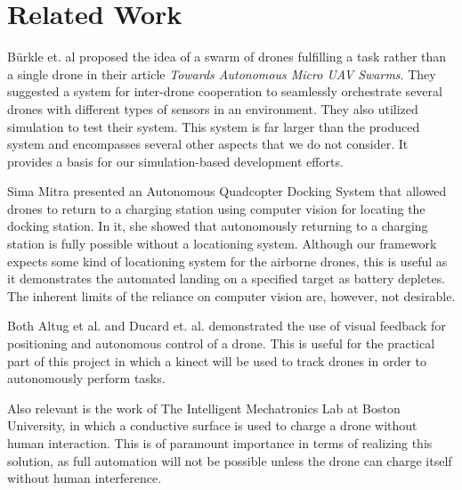\section{Related Work}
Bürkle et. al proposed the idea of a swarm of drones fulfilling a task rather than a single drone in their article \textit{Towards Autonomous Micro UAV Swarms}\cite{burkleetal}. They suggested a system for inter-drone cooperation to seamlessly orchestrate several drones with different types of sensors in an environment. They also utilized simulation to test their system. This system is far larger than the produced system and encompasses several other aspects that we do not consider. It provides a basis for our simulation-based development efforts.

Sima Mitra presented an Autonomous Quadcopter Docking System\cite{simamitra} that allowed drones to return to a charging station using computer vision for locating the docking station. In it, she showed that autonomously returning to a charging station is fully possible without a locationing system. Although our framework expects some kind of locationing system for the airborne drones, this is useful as it demonstrates the automated landing on a specified target as battery depletes. The inherent limits of the reliance on computer vision are, however, not desirable.

Both Altug et al.\cite{altugetal} and Ducard et. al.\cite{ducardetal} demonstrated the use of visual feedback for positioning and autonomous control of a drone. This is useful for the practical part of this project in which a kinect will be used to track drones in order to autonomously perform tasks.

Also relevant is the work of The Intelligent Mechatronics Lab at Boston University, in which a conductive surface is used to charge a drone without human interaction\cite{bostonuni}. This is of paramount importance in terms of realizing this solution, as full automation will not be possible unless the drone can charge itself without human interference.




